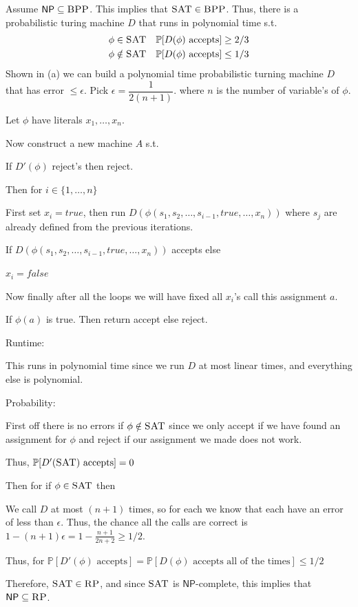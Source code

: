 \documentclass[12pt, letterpaper]{article}
\renewcommand{\P}{\mathbb{P}}
\newcommand{\NP}{\mathsf{NP}}
\renewcommand{\t}[1]{\text{#1}}
\begin{document}
\newcommand{\SAT}{\textsc{SAT}}
\begin{subproblem}{}
    
\end{subproblem}
\begin{problemproof}
    Assume $\NP \subseteq \BPP$. This implies that $\SAT \in \BPP$. Thus, there is a probabilistic turing machine $D$ that runs in polynomial time s.t. 
    \begin{align*}
        \phi \in \SAT \quad \P[D(\phi) \t{ accepts}] \geq 2/3\\
        \phi \notin \SAT \quad \P[D(\phi) \t{ accepts}] \leq 1/3
    \end{align*}
    Shown in (a) we can build a polynomial time probabilistic turning machine $D$ that has error $\leq \epsilon$. Pick $\epsilon=\dfrac{1}{2(n+1)}$. where $n$ is the number of variable's of $\phi$.

    Let $\phi$ have literals $x_1,\dots,x_n$.

    Now construct a new machine $A$ s.t.

    If $D'(\phi)$ reject's then reject.

    Then for $i \in \{1,\dots,n\}$

    First set $x_i=true$, then run $D(\phi(s_1,s_2,\dots,s_{i-1},true,\dots,x_n))$ where $s_j$ are already defined from the previous iterations.

    If $D(\phi(s_1,s_2,\dots,s_{i-1},true,\dots,x_n))$ accepts else
    
    $x_i=false$ 

    Now finally after all the loops we will have fixed all $x_i$'s call this assignment $a$.

    If $\phi(a)$ is true. Then return accept else reject.

    Runtime:

    This runs in polynomial time since we run $D$ at most linear times, and everything else is polynomial.

    Probability:

    First off there is no errors if $\phi \notin \SAT$ since we only accept if we have found an assignment for $\phi$ and reject if our assignment we made does not work.

    Thus, $\P[D'(\SAT) \t{ accepts}] =0$

    Then for if $\phi \in \SAT$ then 
    
    We call $D$ at most $(n+1)$ times, so for each we know that each have an error of less than $\epsilon$. Thus, the chance all the calls are correct is $1-(n+1)\epsilon=1-\frac{n+1}{2n+2} \geq 1/2$.

    Thus, for $\P[D'(\phi) \t{ accepts}]=\P[D(\phi) \t{ accepts all of the times}] \leq 1/2$

    Therefore, $\SAT \in \RP$, and since $\SAT$ is $\NP$-complete, this implies that $\NP \subseteq \RP$.
\end{problemproof}
\end{document}
